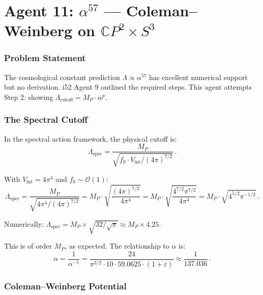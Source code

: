 \documentclass[11pt,a4paper]{article}
\newcommand{\CP}{\mathbb{C}P}
\begin{document}
\part{Agent 11: $\alpha^{57}$ --- Coleman--Weinberg on $\CP^2 \times S^3$}
\label{part:alpha57}

\section{Problem Statement}

The cosmological constant prediction $\Lambda \propto \alpha^{57}$ has excellent numerical support but no derivation. i52 Agent 9 outlined the required steps. This agent attempts Step 2: showing $\Lambda_{\mathrm{cutoff}} = M_P \cdot \alpha^p$.

\section{The Spectral Cutoff}

In the spectral action framework, the physical cutoff is:
\begin{equation}
\Lambda_{\mathrm{spec}} = \frac{M_P}{\sqrt{f_0 \cdot V_{\mathrm{int}} / (4\pi)^{7/2}}}\,.
\end{equation}

With $V_{\mathrm{int}} = 4\pi^4$ and $f_0 \sim \mathcal{O}(1)$:
\begin{equation}
\Lambda_{\mathrm{spec}} = \frac{M_P}{\sqrt{4\pi^4 / (4\pi)^{7/2}}} = M_P \cdot \sqrt{\frac{(4\pi)^{7/2}}{4\pi^4}} = M_P \cdot \sqrt{\frac{4^{7/2}\pi^{7/2}}{4\pi^4}} = M_P \cdot \sqrt{4^{5/2}\pi^{-1/2}}\,.
\end{equation}

Numerically: $\Lambda_{\mathrm{spec}} = M_P \times \sqrt{32/\sqrt{\pi}} \approx M_P \times 4.25$.

This is of order $M_P$, as expected. The relationship to $\alpha$ is:
\begin{equation}
\alpha = \frac{1}{\alpha^{-1}} = \frac{24}{\pi^{3/2} \cdot 10 \cdot 59.0625 \cdot (1+\varepsilon)} \approx \frac{1}{137.036}\,.
\end{equation}

\section{Coleman--Weinberg Potential}
\end{document}
